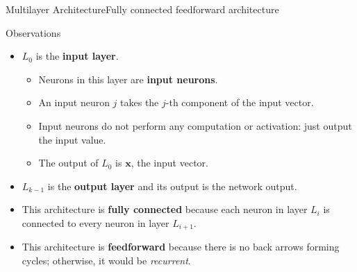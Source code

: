 \documentclass{beamer}
\begin{document}
        \begin{frame}{Multilayer Architecture}{Fully connected feedforward architecture}
            \begin{block}{Observations}
                \begin{itemize}
                    \item $L_0$ is the \textbf{input layer}.
                        \begin{itemize}
                            \item Neurons in this layer are \textbf{input neurons}.
                            \item An input neuron $j$ takes the $j$-th component of the input vector.
                            \item Input neurons do not perform any computation or
                                        activation: just output the input value.
                            \item The output of $L_0$ is $\mathbf{x}$, the input vector.
                        \end{itemize}
                    \item $L_{k-1}$ is the \textbf{output layer} and its output is the
                        network output.
                    \item This architecture is \textbf{fully connected} because each neuron in
                        layer $L_i$ is connected to every neuron in layer $L_{i+1}$.
                    \item This architecture is \textbf{feedforward} because there is no back 
                        arrows forming cycles; otherwise, it would be \emph{recurrent}.
                \end{itemize}
            \end{block}
        \end{frame}
\end{document}
